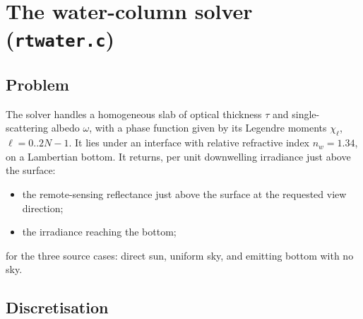 \documentclass[11pt]{article}
\numberwithin{equation}{section}
\newcommand{\code}[1]{\texttt{#1}}
\begin{document}
\section{The water-column solver (\code{rtwater.c})}\label{sec:solver}

\subsection{Problem}

The solver handles a homogeneous slab of optical thickness $\tau$ and single-scattering albedo
$\omega$, with a phase function given by its Legendre moments $\chi_\ell$, $\ell = 0..2N-1$. It
lies under an interface with relative refractive index $n_w = 1.34$, on a Lambertian bottom.
It returns, per unit downwelling irradiance just above the surface:
\begin{itemize}
\item the remote-sensing reflectance just above the surface at the requested view direction;
\item the irradiance reaching the bottom;
\end{itemize}
for the three source cases: direct sun, uniform sky, and emitting bottom with no sky.

\subsection{Discretisation}
\end{document}
